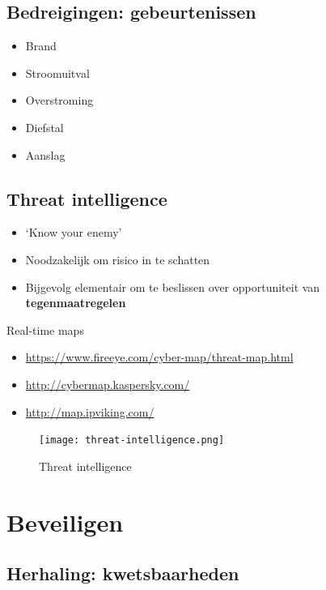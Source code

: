 \documentclass{article}
\newcommand{\bold}[1]{\textbf{#1}}
\begin{document}
\subsection{Bedreigingen: gebeurtenissen}

\begin{itemize}
    \item Brand
    \item Stroomuitval
    \item Overstroming
    \item Diefstal
    \item Aanslag
\end{itemize}


\subsection{Threat intelligence}

\begin{itemize}
    \item `Know your enemy'
    \item Noodzakelijk om risico in te schatten
    \item Bijgevolg elementair om te beslissen over opportuniteit van \bold{tegenmaatregelen}
\end{itemize}

Real-time maps

\begin{itemize}
    \item \url{https://www.fireeye.com/cyber-map/threat-map.html}
    \item \url{http://cybermap.kaspersky.com/}
    \item \url{http://map.ipviking.com/}
\end{itemize}

\begin{figure}[H]
    \centering
    \texttt{[image: threat-intelligence.png]}
    \caption{Threat intelligence}
\end{figure}

\section{Beveiligen}

\subsection{Herhaling: kwetsbaarheden}
\end{document}
